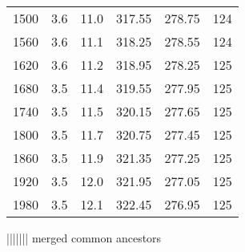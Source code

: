 \begin{table}[H]
\begin{tabular}{S S S S S S}
    1500 & 3.6 & 11.0 & 317.55 & 278.75 & 124 \\
    1560 & 3.6 & 11.1 & 318.25 & 278.55 & 124 \\
    1620 & 3.6 & 11.2 & 318.95 & 278.25 & 125 \\
    1680 & 3.5 & 11.4 & 319.55 & 277.95 & 125 \\
    1740 & 3.5 & 11.5 & 320.15 & 277.65 & 125 \\
    1800 & 3.5 & 11.7 & 320.75 & 277.45 & 125 \\
    1860 & 3.5 & 11.9 & 321.35 & 277.25 & 125 \\
    1920 & 3.5 & 12.0 & 321.95 & 277.05 & 125 \\
    1980 & 3.5 & 12.1 & 322.45 & 276.95 & 125 \\








      \bottomrule
    \end{tabular}
\end{table}
||||||| merged common ancestors
